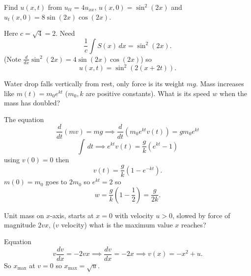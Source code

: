 \documentclass[10pt, a4paper]{article}
\begin{document}
\begin{problem}[$2022$ exam]
    Find $u(x, t)$ from $u_{tt} = 4u_{xx}$,
    $u(x, 0) = \sin ^ 2(2x)$ and $u_t(x, 0) = 8\sin(2x)\cos(2x)$.

    \begin{solution}
        Here $c = \sqrt{4} = 2$.
        Need
        \[
        \frac{1}{c}\int S(x)\,dx = \sin ^ 2(2x).
        \]
        (Note $\frac{d}{dx}\sin ^ 2(2x) = 4\sin(2x)\cos(2x)$)
        so
        \[
        u(x, t) = \sin ^ 2(2(x + 2t)).
        \]
    \end{solution}
\end{problem}

\begin{problem}[$2021$ exam]
    Water drop falls vertically from rest,
    only force is its weight $mg$.
    Mass increases like $m(t) = m_0e ^ {kt}$
    ($m_0, k$ are positive constants).
    What is its speed $w$ when the mass has doubled?

    \begin{solution}
        The equation
        \[
        \frac{d}{dt}(mv) = mg \implies \frac{d}{dt}(m_0e ^ {kt}v(t)) = gm_0e ^ {kt}
        \]
        \[
        \int\,dt \implies e ^ {kt}v(t) = \frac{g}{k}(e ^ {kt} - 1)
        \]
        using $v(0) = 0$ then
        \[
        v(t) = \frac{g}{k}(1 - e ^ {-kt}).
        \]
        $m(0) = m_0$ goes to $2m_0$ so $e ^ {kt} = 2$ so
        \[
        w = \frac{g}{k}\left(1 - \frac{1}{2}\right) = \frac{g}{2k}.
        \]
    \end{solution}
\end{problem}

\begin{problem}[$2021$ exam]
    Unit mass on $x$-axis,
    starts at $x = 0$ with velocity $u > 0$,
    slowed by force of magnitude $2vx$,
    ($v$ velocity)
    what is the maximum value $x$ reaches?

    \begin{solution}
        Equation
        \[
        v\frac{dv}{dx} = -2vx \implies \frac{dv}{dx} = -2x \implies v(x) = -x ^ 2 + u.
        \]
        So $x_{\text{max}}$ at $v = 0$ so $x_{\text{max}} = \sqrt{u}$.
    \end{solution}
\end{problem}
\end{document}
